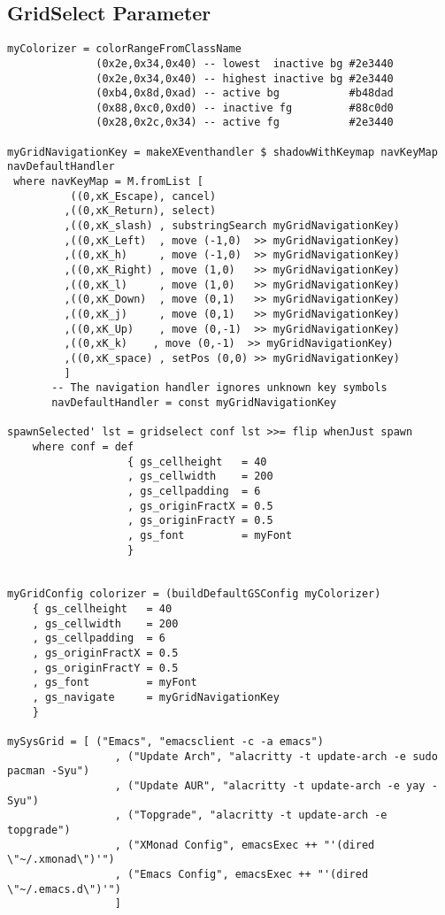 \documentclass[11pt]{article}
\begin{document}
\subsection{GridSelect Parameter}
\label{sec:org33e26b9}
\begin{verbatim}
myColorizer = colorRangeFromClassName
              (0x2e,0x34,0x40) -- lowest  inactive bg #2e3440
              (0x2e,0x34,0x40) -- highest inactive bg #2e3440
              (0xb4,0x8d,0xad) -- active bg           #b48dad
              (0x88,0xc0,0xd0) -- inactive fg         #88c0d0
              (0x28,0x2c,0x34) -- active fg           #2e3440

myGridNavigationKey = makeXEventhandler $ shadowWithKeymap navKeyMap navDefaultHandler
 where navKeyMap = M.fromList [
          ((0,xK_Escape), cancel)
         ,((0,xK_Return), select)
         ,((0,xK_slash) , substringSearch myGridNavigationKey)
         ,((0,xK_Left)  , move (-1,0)  >> myGridNavigationKey)
         ,((0,xK_h)     , move (-1,0)  >> myGridNavigationKey)
         ,((0,xK_Right) , move (1,0)   >> myGridNavigationKey)
         ,((0,xK_l)     , move (1,0)   >> myGridNavigationKey)
         ,((0,xK_Down)  , move (0,1)   >> myGridNavigationKey)
         ,((0,xK_j)     , move (0,1)   >> myGridNavigationKey)
         ,((0,xK_Up)    , move (0,-1)  >> myGridNavigationKey)
         ,((0,xK_k)    , move (0,-1)  >> myGridNavigationKey)
         ,((0,xK_space) , setPos (0,0) >> myGridNavigationKey)
         ]
       -- The navigation handler ignores unknown key symbols
       navDefaultHandler = const myGridNavigationKey

spawnSelected' lst = gridselect conf lst >>= flip whenJust spawn
    where conf = def
                   { gs_cellheight   = 40
                   , gs_cellwidth    = 200
                   , gs_cellpadding  = 6
                   , gs_originFractX = 0.5
                   , gs_originFractY = 0.5
                   , gs_font         = myFont
                   }


myGridConfig colorizer = (buildDefaultGSConfig myColorizer)
    { gs_cellheight   = 40
    , gs_cellwidth    = 200
    , gs_cellpadding  = 6
    , gs_originFractX = 0.5
    , gs_originFractY = 0.5
    , gs_font         = myFont
    , gs_navigate     = myGridNavigationKey
    }

mySysGrid = [ ("Emacs", "emacsclient -c -a emacs")
                 , ("Update Arch", "alacritty -t update-arch -e sudo pacman -Syu")
                 , ("Update AUR", "alacritty -t update-arch -e yay -Syu")
                 , ("Topgrade", "alacritty -t update-arch -e topgrade")
                 , ("XMonad Config", emacsExec ++ "'(dired \"~/.xmonad\")'")
                 , ("Emacs Config", emacsExec ++ "'(dired \"~/.emacs.d\")'")
                 ]


\end{verbatim}
\end{document}
